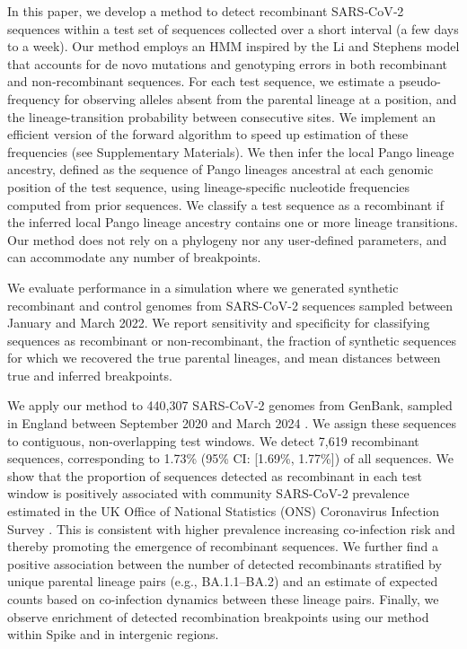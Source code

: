 \documentclass[11pt,oneside,letterpaper]{article}
\begin{document}
In this paper, we develop a method to detect recombinant SARS‑CoV‑2 sequences within a test set of sequences collected over a short interval (a few days to a week). Our method employs an HMM inspired by the Li and Stephens model \cite{li_modeling_2003} that accounts for de novo mutations and genotyping errors in both recombinant and non‑recombinant sequences. For each test sequence, we estimate a pseudo-frequency for observing alleles absent from the parental lineage at a position, and the lineage-transition probability between consecutive sites. We implement an efficient version of the forward algorithm to speed up estimation of these frequencies (see Supplementary Materials). We then infer the local Pango lineage ancestry, defined as the sequence of Pango lineages ancestral at each genomic position of the test sequence, using lineage-specific nucleotide frequencies computed from prior sequences. We classify a test sequence as a recombinant if the inferred local Pango lineage ancestry contains one or more lineage transitions. Our method does not rely on a phylogeny nor any user‑defined parameters, and can accommodate any number of breakpoints.

We evaluate performance in a simulation where we generated synthetic recombinant and control genomes from SARS-CoV-2 sequences sampled between January and March 2022. We report sensitivity and specificity for classifying sequences as recombinant or non-recombinant, the fraction of synthetic sequences for which we recovered the true parental lineages, and mean distances between true and inferred breakpoints.

We apply our method to 440,307 SARS‑CoV‑2 genomes from GenBank, sampled in England between September 2020 and March 2024 \cite{benson_genbank_2013}. We assign these sequences to contiguous, non-overlapping test windows. We detect 7,619 recombinant sequences, corresponding to 1.73\% (95\% CI: [1.69\%, 1.77\%]) of all sequences. We show that the proportion of sequences detected as recombinant in each test window is positively associated with community SARS-CoV-2 prevalence estimated in the UK Office of National Statistics (ONS) Coronavirus Infection Survey \cite{pouwels_community_2021}. This is consistent with higher prevalence increasing co-infection risk and thereby promoting the emergence of recombinant sequences. We further find a positive association between the number of detected recombinants stratified by unique parental lineage pairs (e.g., BA.1.1--BA.2) and an estimate of expected counts based on co-infection dynamics between these lineage pairs. Finally, we observe enrichment of detected recombination breakpoints using our method within Spike and in intergenic regions.
\end{document}
